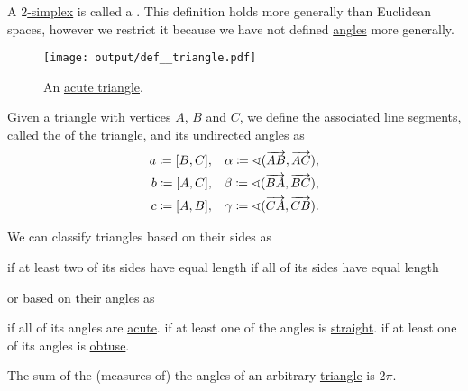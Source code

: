 \begin{definition}\label{def:triangle}
  A \hyperref[def:simplex]{\( 2 \)-simplex} is called a . This definition holds more generally than Euclidean spaces, however we restrict it because we have not defined \hyperref[def:angle]{angles} more generally.

  \begin{figure}[!ht]
    \centering
    \texttt{[image: output/def\_\_triangle.pdf]}
    \caption{An \hyperref[def:triangle/acute]{acute triangle}.}\label{fig:def:triangle}
  \end{figure}

  Given a triangle with vertices \( A \), \( B \) and \( C \), we define the associated \hyperref[def:line_segment]{line segments}, called the  of the triangle, and its \hyperref[def:angle]{undirected angles} as
  \begin{align*}
    a \coloneqq [B, C], && \alpha \coloneqq \sphericalangle(\overrightarrow{AB}, \overrightarrow{AC}), \\
    b \coloneqq [A, C], && \beta  \coloneqq \sphericalangle(\overrightarrow{BA}, \overrightarrow{BC}),  \\
    c \coloneqq [A, B], && \gamma \coloneqq \sphericalangle(\overrightarrow{CA}, \overrightarrow{CB}).
  \end{align*}

  We can classify triangles based on their sides as
  \begin{thmenum}
      if at least two of its sides have equal length
      if all of its sides have equal length
  \end{thmenum}
  or based on their angles as
  \begin{thmenum}
      if all of its angles are \hyperref[def:angle/measure/acute]{acute}.
      if at least one of the angles is \hyperref[def:angle/measure/straight]{straight}.
      if at least one of its angles is \hyperref[def:angle/measure/obtuse]{obtuse}.
  \end{thmenum}
\end{definition}

\begin{proposition}\label{thm:sum_of_angle_triangles}
  The sum of the (measures of) the angles of an arbitrary \hyperref[def:triangle]{triangle} is \( 2\pi \).
\end{proposition}
